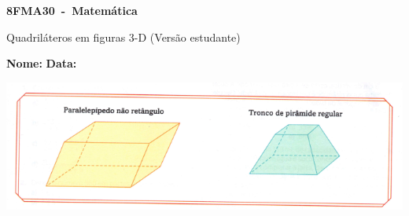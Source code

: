 \documentclass[a4paper,14pt]{article}
\begin{document}
	
	\noindent\textbf{8FMA30~-~Matemática} 
	
	\begin{center}Quadriláteros em figuras 3-D (Versão estudante)
	\end{center}
	
	
	\noindent\textbf{Nome:} \underline{\hspace{10cm}}
	\noindent\textbf{Data:} \underline{\hspace{4cm}}
	
	\includegraphics[width=1\linewidth]{8FMA30_imagens/aula30-1}
\end{document}
